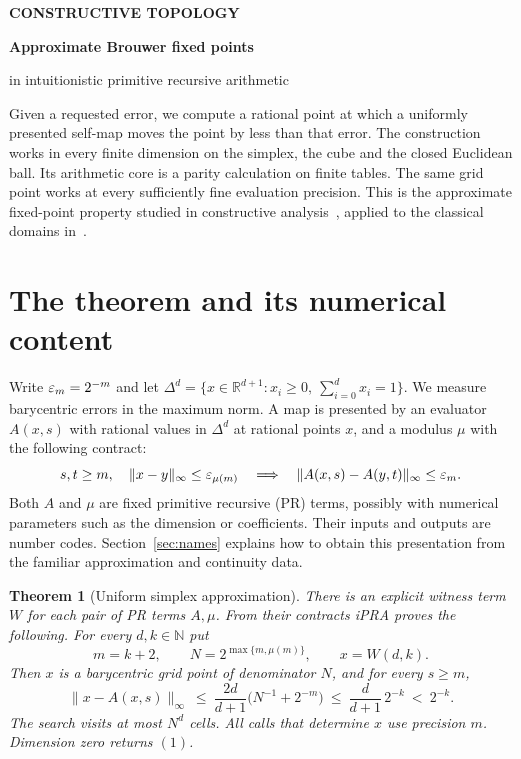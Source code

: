 \documentclass[11pt,letterpaper]{article}
\newcommand{\N}{\mathbb N}\newcommand{\Q}{\mathbb Q}
\newcommand{\norm}[1]{\lVert #1\rVert_\infty}
\theoremstyle{claim}\newtheorem{theorem}{Theorem}\newtheorem{lemma}[theorem]{Lemma}
\begin{document}
\thispagestyle{plain}
{\noindent\small\sffamily\bfseries\color{accent} CONSTRUCTIVE TOPOLOGY}\par\vspace{5pt}
{\noindent\fontsize{24}{28}\selectfont\sffamily\bfseries\color{ink} Approximate Brouwer fixed points}\par
{\noindent\large in intuitionistic primitive recursive arithmetic}\par\vspace{11pt}
\noindent
Given a requested error, we compute a rational point at which a uniformly
presented self-map moves the point by less than that error. The construction
works in every finite dimension on the simplex, the cube and the closed
Euclidean ball. Its arithmetic core is a parity calculation on finite tables.
The same grid point works at every sufficiently fine evaluation precision.
This is the approximate fixed-point property studied in constructive
analysis~\cite{kuhn,hendtlass}, applied to the classical domains
in~\cite{brouwer}.

\section{The theorem and its numerical content}
Write $\varepsilon_{m}=2^{-m}$ and let
$\Delta^d=\{x\in\mathbb R^{d+1}:x_i\ge0,\ \sum_{i=0}^d x_i=1\}$.
We measure barycentric errors in the maximum norm.
A map is presented by an evaluator $A(x,s)$ with rational values in
$\Delta^d$ at rational points $x$, and a modulus $\mu$ with the following contract:
\begin{equation}
\label{eq:contract}
 s,t\ge m,\quad\norm{x-y}\le\epsi{\mu(m)}
 \quad\Longrightarrow\quad \norm{A(x,s)-A(y,t)}\le\epsi m .
\end{equation}
Both $A$ and $\mu$ are fixed primitive recursive (PR) terms, possibly with numerical
parameters such as the dimension or coefficients. Their inputs and outputs are
number codes. Section~\ref{sec:names} explains how to obtain this presentation
from the familiar approximation and continuity data.

\begin{theorem}[Uniform simplex approximation]\label{thm:main}
There is an explicit witness term $W$ for each pair of PR terms $A,\mu$.
From their contracts iPRA proves the following. For every $d,k\in\N$ put
\[
 m=k+2,\qquad N=2^{\max\{m,\mu(m)\}},\qquad x=W(d,k).
\]
Then $x$ is a barycentric grid point of denominator $N$, and for every $s\ge m$,
\begin{equation}\label{eq:main}
 \norm{x-A(x,s)}
 \ \le\ \frac{2d}{d+1}\bigl(N^{-1}+2^{-m}\bigr)
 \ \le\ \frac{d}{d+1}\,2^{-k}\ <\ 2^{-k}.
\end{equation}
The search visits at most $N^d$ cells. All calls that determine $x$ use
precision $m$. Dimension zero returns $(1)$.
\end{theorem}
\end{document}
